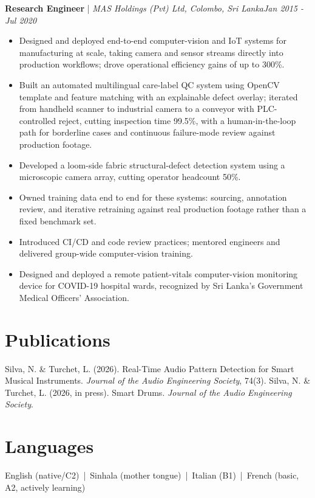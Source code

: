 \documentclass[11pt]{article}
\newenvironment{cvrole}[5]{%
  \par\noindent\textbf{\large #1} | \textit{\small #2, #3}\hfill \textit{\small #4 - #5}\par
  \begin{itemize}[leftmargin=2em, itemsep=-0.3em, topsep=-0.5em]%
}{%
  \end{itemize}\par\noindent\mbox{}\par\vspace{0.1em}%
}
\begin{document}
\begin{cvrole}{Research Engineer}{MAS Holdings (Pvt) Ltd}{Colombo, Sri Lanka}{Jan 2015}{Jul 2020}
\item Designed and deployed end-to-end computer-vision and IoT systems for manufacturing at scale, taking camera and sensor streams directly into production workflows; drove operational efficiency gains of up to 300\%.
\item Built an automated multilingual care-label QC system using OpenCV template and feature matching with an explainable defect overlay; iterated from handheld scanner to industrial camera to a conveyor with PLC-controlled reject, cutting inspection time 99.5\%, with a human-in-the-loop path for borderline cases and continuous failure-mode review against production footage.
\item Developed a loom-side fabric structural-defect detection system using a microscopic camera array, cutting operator headcount 50\%.
\item Owned training data end to end for these systems: sourcing, annotation review, and iterative retraining against real production footage rather than a fixed benchmark set.
\item Introduced CI/CD and code review practices; mentored engineers and delivered group-wide computer-vision training.
\item Designed and deployed a remote patient-vitals computer-vision monitoring device for COVID-19 hospital wards, recognized by Sri Lanka's Government Medical Officers' Association.
\end{cvrole}

\section*{Publications}
Silva, N. \& Turchet, L. (2026). Real-Time Audio Pattern Detection for Smart Musical Instruments. \textit{Journal of the Audio Engineering Society}, 74(3). Silva, N. \& Turchet, L. (2026, in press). Smart Drums. \textit{Journal of the Audio Engineering Society}.

\section*{Languages}
English (native/C2) \,|\, Sinhala (mother tongue) \,|\, Italian (B1) \,|\, French (basic, A2, actively learning)
\end{document}
